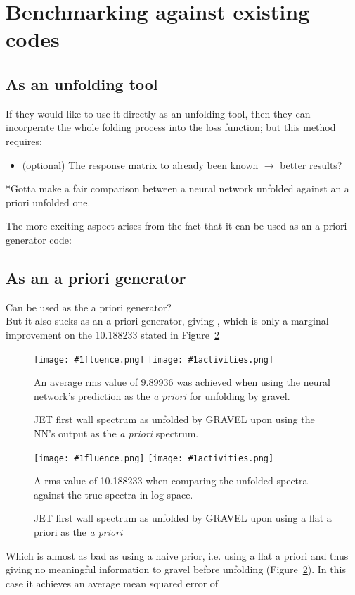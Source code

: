 \documentclass[a4paper, 12pt]{article}
\newcommand{\fluenceandactivities}[1]{
\texttt{[image: \#1fluence.png]}
\texttt{[image: \#1activities.png]}
}
\begin{document}
\section{Benchmarking against existing codes}
\subsection{As an unfolding tool}
If they would like to use it directly as an unfolding tool, then they can incorperate the whole folding process into the loss function; but this method requires:
\begin{itemize}
    \item (optional) The response matrix to already been known $\rightarrow$ better results?
\end{itemize}
*Gotta make a fair comparison between a neural network unfolded against an a priori unfolded one.

The more exciting aspect arises from the fact that it can be used as an a priori generator code:
\subsection{As an a priori generator}
Can be used as the a priori generator?\\
But it also sucks as an a priori generator, giving , which is only a marginal improvement on the 10.188233 stated in Figure~\ref{gravel_flat_a_priori_JET}
\begin{figure}
    \centering
    \fluenceandactivities{/home/ocean/Documents/GitHubDir/unfolding/unfolding/unfoldingsuite/neuralnetwork/realinputEarlyStopping/comparison/real_fusion_test_gravel_nn_a_priori_test_001_}
    \caption{JET first wall spectrum as unfolded by GRAVEL upon using the NN's output as the \emph{a priori} spectrum.}\label{gravel_nn_a_priori_JET}
    An average rms value of 9.89936 was achieved when using the neural network's prediction as the \emph{a priori} for unfolding by gravel.
\end{figure}

\begin{figure}
\centering
    \fluenceandactivities{/home/ocean/Documents/GitHubDir/unfolding/unfolding/unfoldingsuite/neuralnetwork/realinputEarlyStopping/comparison/real_fusion_test_gravel_test_001_}
    \caption{JET first wall spectrum as unfolded by GRAVEL upon using a flat a priori as the \emph{a priori}}\label{gravel_flat_a_priori_JET}
    A rms value of 10.188233 when comparing the unfolded spectra against the true spectra in log space.
\end{figure}
Which is almost as bad as using a naive prior, i.e. using a flat a priori and thus giving no meaningful information to gravel before unfolding (Figure~\ref{gravel_flat_a_priori_JET}). In this case it achieves an average mean squared error of 
\end{document}
